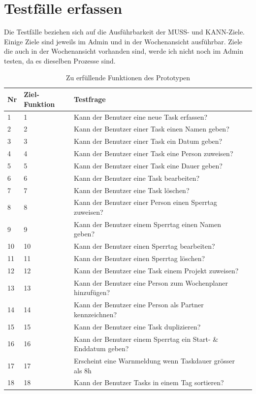 \section{Testfälle erfassen}
Die Testfälle beziehen sich auf die Ausführbarkeit der MUSS- und KANN-Ziele.
Einige Ziele sind jeweils im Admin und in der Wochenansicht ausführbar.
Ziele die auch in der Wochenansicht vorhanden sind, werde ich nicht noch im Admin testen, da es dieselben Prozesse sind.
\begin{table}[!ht]
\begin{center}
    \begin{tabular}{llp{12cm}l}
        \toprule Nr & Ziel-Funktion & Testfrage \\
        \midrule 1 & 1 & Kann der Benutzer eine neue Task erfassen?\\
        \midrule 2 & 2 & Kann der Benutzer einer Task einen Namen geben? \\
        \midrule 3 & 3 & Kann der Benutzer einer Task ein Datum geben? \\
        \midrule 4 & 4 & Kann der Benutzer einer Task eine Person zuweisen? \\
        \midrule 5 & 5 & Kann der Benutzer einer Task eine Dauer geben? \\
        \midrule 6 & 6 & Kann der Benutzer eine Task bearbeiten? \\ 
        \midrule 7 & 7 & Kann der Benutzer eine Task löschen? \\
        \midrule 8 & 8 & Kann der Benutzer einer Person einen Sperrtag zuweisen? \\
        \midrule 9 & 9 & Kann der Benutzer einem Sperrtag einen Namen geben? \\
        \midrule 10 & 10 & Kann der Benutzer einen Sperrtag bearbeiten?\\
        \midrule 11 & 11 & Kann der Benutzer einen Sperrtag löschen?\\
        \midrule 12 & 12 & Kann der Benutzer eine Task einem Projekt zuweisen?\\
        \midrule 13 & 13 & Kann der Benutzer eine Person zum Wochenplaner hinzufügen?\\
        \midrule 14 & 14 & Kann der Benutzer eine Person als Partner kennzeichnen?\\
        \midrule 15 & 15 & Kann der Benutzer eine Task duplizieren?\\
        \midrule 16 & 16 & Kann der Benutzer einem Sperrtag ein Start- \& Enddatum geben?\\
        \midrule 17 & 17 & Erscheint eine Warnmeldung wenn Taskdauer grösser als 8h \\
        \midrule 18 & 18 & Kann der Benutzer Tasks in einem Tag sortieren?\\
        \bottomrule
    \end{tabular}
    \caption{Zu erfüllende Funktionen des Prototypen}
    \label{tab:testing_muss_funktionen}
\end{center}
\end{table}
